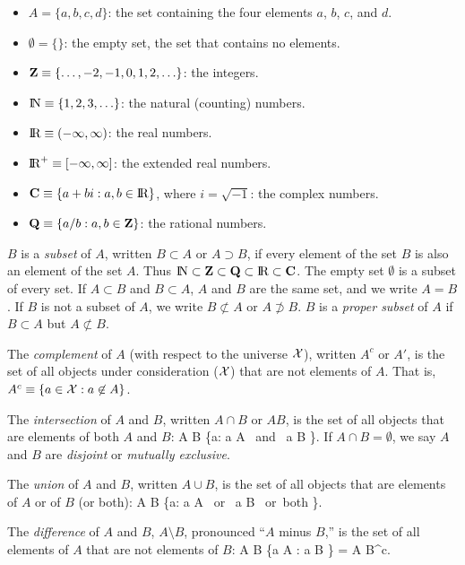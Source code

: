 \begin{itemize}
        \item $A = \{a, b, c, d \}$: the set containing the four elements $a$, $b$, $c$, and $d$.
        \item $\emptyset = \{ \}$: the empty set, the set that contains no elements.
        \item ${\bf Z} \equiv \{ \ldots, -2, -1, 0, 1, 2, \ldots \}$: the integers.
        \item $\hbox{I\kern-.17em\hbox{N}} \equiv \{1, 2, 3, \ldots \}$: the natural (counting) numbers.
        \item $\hbox{I\kern-.17em\hbox{R}} \equiv (-\infty, \infty)$: the real numbers.
        \item $\hbox{I\kern-.17em\hbox{R}}^+ \equiv [-\infty, \infty]$: the extended real numbers.
        \item ${\bf C} \equiv \{ a + bi: a, b \in \hbox{I\kern-.17em\hbox{R}} \}$, where $i = \sqrt{-1}$: the complex numbers.
        \item ${\bf Q} \equiv \{ a/b: a, b \in {\bf Z}\}$: the rational numbers.
\end{itemize}

$B$ is a {\em subset\/} of $A$, written $B \subset A$ or $A \supset B$, if every element
of the set $B$ is also an element of the set $A$.
Thus $\hbox{I\kern-.17em\hbox{N}} \subset {\bf Z} \subset {\bf Q} \subset \hbox{I\kern-.17em\hbox{R}} \subset {\bf C}$.
The empty set $\emptyset$ is a subset of every set.
If $A \subset B$ and $B \subset A$, $A$ and $B$ are the same set, and we write $A = B$.
If $B$ is not a subset of $A$, we write $B \not \subset A$ or $A \not \supset B$.
$B$ is a {\em proper subset\/} of $A$ if $B \subset A$ but
$A \not \subset B$.

The {\em complement\/} of $A$ (with respect to the universe ${\cal X}$), written $A^c$ or $A'$,
is the set of all objects under consideration (${\cal X}$) that are not elements of $A$.
That is, $A^c \equiv \{ a \in {\cal X} : a \not \in A\}$.

The {\em intersection} of $A$ and $B$, written $A \cap B$ or $AB$, is the set of all objects that
are elements of both $A$ and $B$:
\beq
        A \cap B \equiv \{a: a \in A \mbox{ and } a \in B \}.
\eeq
If $A \cap B = \emptyset$, we say $A$ and $B$ are {\em disjoint\/} or {\em mutually
exclusive\/}.

The {\em union} of $A$ and $B$, written $A \cup B$, is the set of all objects that
are elements of $A$ or of $B$ (or both):
\beq
        A \cup B \equiv \{a: a \in A \mbox{ or } a \in B \mbox{ or both} \}.
\eeq

The {\em difference} of $A$ and $B$, $A \setminus B$, pronounced ``$A$ minus $B$,'' is
the set of all elements of $A$ that are not elements of $B$:
\beq
        A \setminus B \equiv \{a \in A : a \not \in B \} = A \cap B^c.
\eeq

